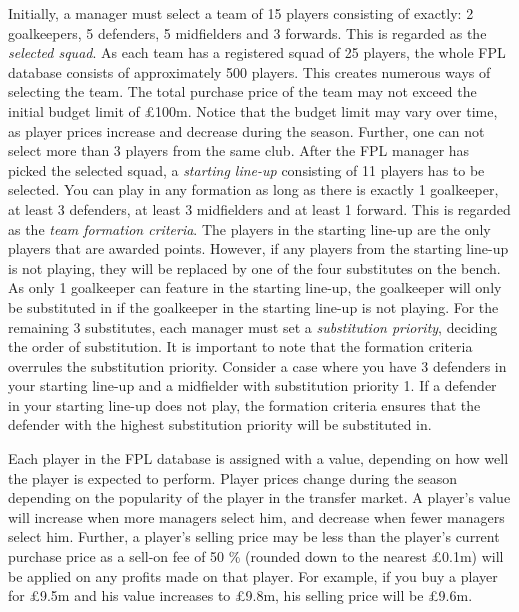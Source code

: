 \newpar

Initially, a manager must select a team of 15 players consisting of exactly: 2 goalkeepers, 5 defenders, 5 midfielders and 3 forwards. This is regarded as the \textit{selected squad}. As each team has a registered squad of 25 players, the whole FPL database consists of approximately 500 players. This creates numerous ways of selecting the team. The total purchase price of the team may not exceed the initial budget limit of \pounds 100m. Notice that the budget limit may vary over time, as player prices increase and decrease during the season. Further, one can not select more than 3 players from the same club. After the FPL manager has picked the selected squad, a \textit{starting line-up} consisting of 11 players has to be selected. You can play in any formation as long as there is exactly 1 goalkeeper, at least 3 defenders, at least 3 midfielders and at least 1 forward. This is regarded as the \textit{team formation criteria}. The players in the starting line-up are the only players that are awarded points. However, if any players from the starting line-up is not playing, they will be replaced by one of the four substitutes on the bench. As only 1 goalkeeper can feature in the starting line-up, the goalkeeper will only be substituted in if the goalkeeper in the starting line-up is not playing. For the remaining 3 substitutes, each manager must set a \textit{substitution priority}, deciding the order of substitution. It is important to note that the formation criteria overrules the substitution priority. Consider a case where you have 3 defenders in your starting line-up and a midfielder with substitution priority 1. If a defender in your starting line-up does not play, the formation criteria ensures that the defender with the highest substitution priority will be substituted in. 

\newpar

Each player in the FPL database is assigned with a value, depending on how well the player is expected to perform. Player prices change during the season depending on the popularity of the player in the transfer market. A player's value will increase when more managers select him, and decrease when fewer managers select him. Further, a player's selling price may be less than the player's current purchase price as a sell-on fee of 50 \% (rounded down to the nearest \pounds 0.1m) will be applied on any profits made on that player. For example, if you buy a player for \pounds 9.5m and his value increases to \pounds 9.8m, his selling price will be \pounds 9.6m.

